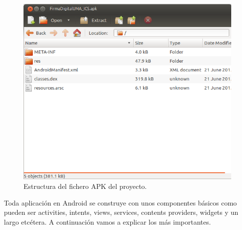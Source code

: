\begin{figure}[h]
  \centering
    \includegraphics[scale=0.8]{./Android/imagenes/estructuraAPK.png}
  \caption{Estructura del fichero APK del proyecto.}
  \label{fig:estructuraAPK}
\end{figure}

Toda aplicación en Android se construye con unos componentes básicos como pueden ser activities, intents, views, services, contents providers, widgets y un largo etcétera. A continuación vamos a explicar los más importantes.

